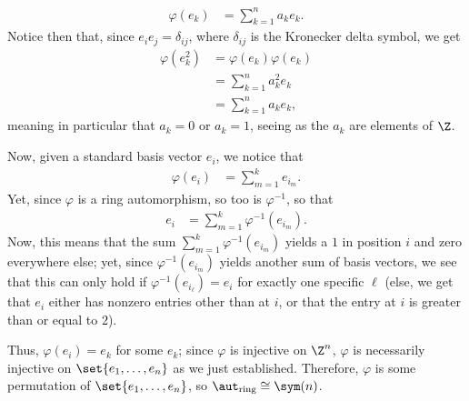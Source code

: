 \documentclass[10pt]{mypackage}
\begin{document}
\begin{solution}
\begin{enumerate}[(a)]
      \begin{align*}
        \varphi\left( e_k \right) &= \sum_{k=1}^{n}a_ke_k.
      \end{align*}
      Notice then that, since $e_ie_j = \delta_{ij}$, where $\delta_{ij}$ is the Kronecker delta symbol, we get
      \begin{align*}
        \varphi\left( e_k^2 \right) &= \varphi\left( e_k \right)\varphi\left( e_k \right)\\
                                    &= \sum_{k=1}^{n} a_k^2e_k\\
                                    &= \sum_{k=1}^{n}a_ke_k,
      \end{align*}
      meaning in particular that $a_k = 0$ or $a_k = 1$, seeing as the $a_k$ are elements of $\Z$.\newline

      Now, given a standard basis vector $e_i$, we notice that
      \begin{align*}
        \varphi\left( e_i \right) &= \sum_{m=1}^{k}e_{i_m}.
      \end{align*}
      Yet, since $\varphi$ is a ring automorphism, so too is $\varphi^{-1}$, so that
      \begin{align*}
        e_i &= \sum_{m=1}^{k} \varphi^{-1}\left( e_{i_m} \right).
      \end{align*}
      Now, this means that the sum $\sum_{m=1}^{k}\varphi^{-1}\left( e_{i_m} \right)$ yields a $1$ in position $i$ and zero everywhere else; yet, since $\varphi^{-1}\left( e_{i_m} \right)$ yields another sum of basis vectors, we see that this can only hold if $\varphi^{-1}\left( e_{i_\ell} \right) = e_i$ for exactly one specific $\ell$ (else, we get that $e_i$ either has nonzero entries other than at $i$, or that the entry at $i$ is greater than or equal to $2$).\newline

      Thus, $\varphi\left( e_i \right) = e_k$ for some $e_k$; since $\varphi$ is injective on $\Z^{n}$, $\varphi$ is necessarily injective on $\set{e_1,\dots,e_n}$ as we just established. Therefore, $\varphi$ is some permutation of $\set{e_1,\dots,e_n}$, so $\aut_{\text{ring}}\cong \sym(n)$.
  \end{enumerate}
\end{solution}
\end{document}
